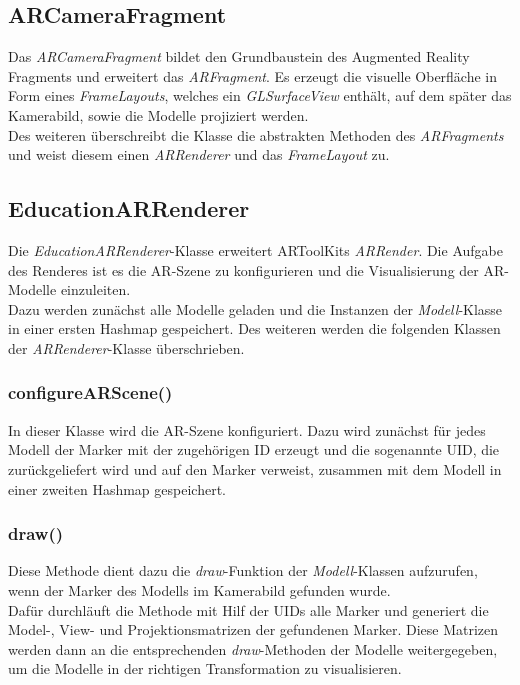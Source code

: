 \subsection{ARCameraFragment}
Das \textit{ARCameraFragment} bildet den Grundbaustein des Augmented Reality Fragments und erweitert das \textit{ARFragment}.
Es erzeugt die visuelle Oberfläche in Form eines \textit{FrameLayouts}, welches ein \textit{GLSurfaceView} enthält, auf dem später das Kamerabild, sowie die Modelle projiziert werden. \\
Des weiteren überschreibt die Klasse die abstrakten Methoden des \textit{ARFragments} und weist diesem  einen \textit{ARRenderer} und das \textit{FrameLayout} zu.

\subsection{EducationARRenderer}
Die \textit{EducationARRenderer}-Klasse erweitert ARToolKits \textit{ARRender}. Die Aufgabe des Renderes ist es die AR-Szene zu konfigurieren und die Visualisierung der AR-Modelle einzuleiten. \\
Dazu werden zunächst alle Modelle geladen und die Instanzen der \textit{Modell}-Klasse in einer ersten Hashmap gespeichert. Des weiteren werden die folgenden Klassen der \textit{ARRenderer}-Klasse überschrieben.

\subsubsection{configureARScene()}
In dieser Klasse wird die AR-Szene konfiguriert. Dazu wird zunächst für jedes Modell der Marker mit der zugehörigen ID erzeugt und die sogenannte UID, die zurückgeliefert wird und auf den Marker verweist, zusammen mit dem Modell in einer zweiten Hashmap gespeichert.

\subsubsection{draw()}
Diese Methode dient dazu die \textit{draw}-Funktion der \textit{Modell}-Klassen aufzurufen, wenn der Marker des Modells im Kamerabild gefunden wurde.\\
Dafür durchläuft die Methode mit Hilf der UIDs alle Marker und generiert die Model-, View- und Projektionsmatrizen der gefundenen Marker. Diese Matrizen werden dann an die entsprechenden \textit{draw}-Methoden der Modelle weitergegeben, um die Modelle in der richtigen Transformation zu visualisieren. 


